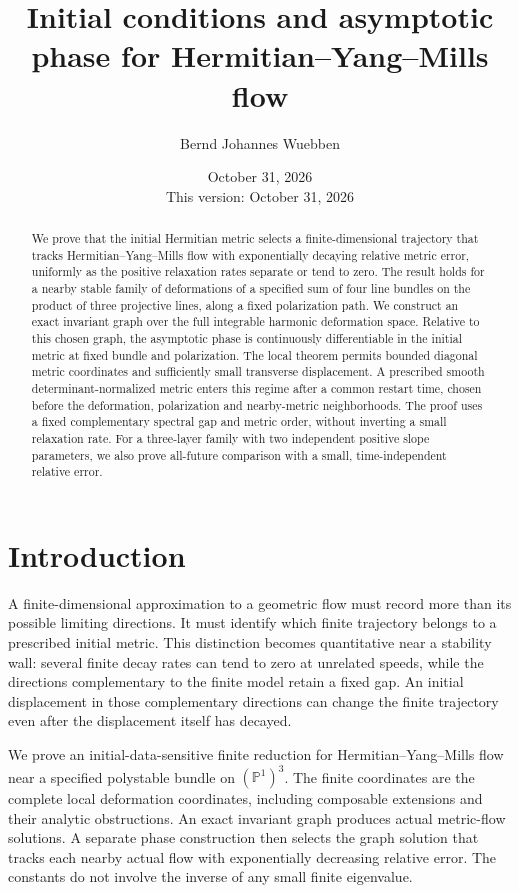 \documentclass[11pt]{amsart}
\title[Initial conditions and HYM flow]{Initial conditions and asymptotic phase for Hermitian--Yang--Mills flow}
\author{Bernd Johannes Wuebben}
\date{October 31, 2026\\This version: October 31, 2026}
\theoremstyle{definition}
\theoremstyle{remark}
\newcommand{\PP}{\mathbb P}
\begin{document}
\begin{abstract}
We prove that the initial Hermitian metric selects a finite-dimensional
trajectory that tracks Hermitian--Yang--Mills flow with exponentially
decaying relative metric error, uniformly as the positive relaxation
rates separate or tend to zero. The result holds for a nearby stable
family of deformations of a specified sum of four line bundles on the
product of three projective lines, along a fixed polarization path.
We construct an exact invariant graph over the full integrable harmonic
deformation space. Relative to this chosen graph, the asymptotic phase
is continuously differentiable in the initial metric at fixed bundle
and polarization. The local theorem permits bounded diagonal metric
coordinates and sufficiently small transverse displacement. A prescribed
smooth determinant-normalized metric enters this regime after a common
restart time, chosen before the deformation, polarization and
nearby-metric neighborhoods. The proof uses a fixed complementary
spectral gap and metric order, without inverting a small relaxation
rate. For a three-layer family with two independent positive slope
parameters, we also prove all-future comparison with a small,
time-independent relative error.
\end{abstract}

\maketitle


\section{Introduction}

A finite-dimensional approximation to a geometric flow must record
more than its possible limiting directions. It must identify which
finite trajectory belongs to a prescribed initial metric. This
distinction becomes quantitative near a stability wall: several
finite decay rates can tend to zero at unrelated speeds, while the
directions complementary to the finite model retain a fixed gap.
An initial displacement in those complementary directions can
change the finite trajectory even after the displacement itself
has decayed.

We prove an initial-data-sensitive finite reduction for
Hermitian--Yang--Mills flow near a specified polystable bundle
on $(\PP^1)^3$. The finite coordinates are the complete local
deformation coordinates, including composable extensions and
their analytic obstructions. An exact invariant graph produces
actual metric-flow solutions. A separate phase construction then
selects the graph solution that tracks each nearby actual flow
with exponentially decreasing relative error. The constants do
not involve the inverse of any small finite eigenvalue.
\end{document}

